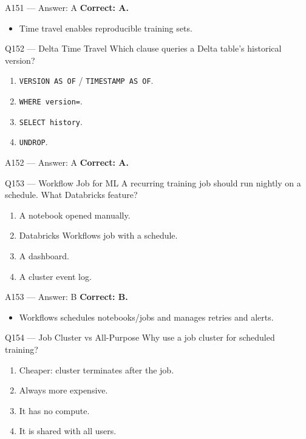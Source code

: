 \documentclass[aspectratio=169,9pt]{beamer}
\begin{document}
	\begin{frame}{A151 --- Answer: A}
		\textbf{Correct: A.}
		\begin{itemize}
			\item Time travel enables reproducible training sets.
		\end{itemize}
	\end{frame}
	
	\begin{frame}{Q152 --- Delta Time Travel}
		Which clause queries a Delta table's historical version?
		\begin{enumerate}[label=\Alph*.]
			\item \texttt{VERSION AS OF} / \texttt{TIMESTAMP AS OF}.
			\item \texttt{WHERE version=}.
			\item \texttt{SELECT history}.
			\item \texttt{UNDROP}.
		\end{enumerate}
	\end{frame}
	
	\begin{frame}{A152 --- Answer: A}
		\textbf{Correct: A.}
	\end{frame}
	
	\begin{frame}{Q153 --- Workflow Job for ML}
		A recurring training job should run nightly on a schedule. What Databricks feature?
		\begin{enumerate}[label=\Alph*.]
			\item A notebook opened manually.
			\item Databricks Workflows job with a schedule.
			\item A dashboard.
			\item A cluster event log.
		\end{enumerate}
	\end{frame}
	
	\begin{frame}{A153 --- Answer: B}
		\textbf{Correct: B.}
		\begin{itemize}
			\item Workflows schedules notebooks/jobs and manages retries and alerts.
		\end{itemize}
	\end{frame}
	
	\begin{frame}{Q154 --- Job Cluster vs All-Purpose}
		Why use a job cluster for scheduled training?
		\begin{enumerate}[label=\Alph*.]
			\item Cheaper: cluster terminates after the job.
			\item Always more expensive.
			\item It has no compute.
			\item It is shared with all users.
		\end{enumerate}
	\end{frame}
	
\end{document}

